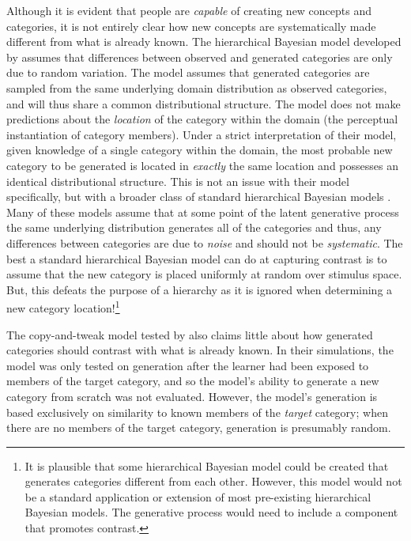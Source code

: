 \documentclass[12pt]{article}
\begin{document}
\begin{flushleft}
Although it is evident that people are {\em capable} of creating new concepts and categories, it is not entirely clear how new concepts are systematically made different from what is already known. The hierarchical Bayesian model developed by \cite{jern2013probabilistic} assumes that differences between observed and generated categories are only due to random variation. The model assumes that generated categories are sampled from the same underlying domain distribution as observed categories, and will thus share a common distributional structure. The model does not make predictions about the {\em location} of the category within the domain (the perceptual instantiation of category members). Under a strict interpretation of their model, given knowledge of a single category within the domain, the most probable new category to be generated is located in {\em exactly} the same location and possesses an identical distributional structure. This is not an issue with their model specifically, but with a broader class of standard hierarchical Bayesian models \citep[e.g., ][]{griffithsscn07,kemp07}. Many of these models assume that at some point of the latent generative process the same underlying distribution generates all of the categories and thus, any differences between categories are due to {\em noise} and should not be {\em systematic}. The best a standard hierarchical Bayesian model can do at capturing contrast is to assume that the new category is placed uniformly at random over stimulus space. But, this defeats the purpose of a hierarchy as it is ignored when determining a new category location!\footnote{It is plausible that some hierarchical Bayesian model could be created that generates categories different from each other. However, this model would not be a standard application or extension of most pre-existing hierarchical Bayesian models. The generative process would need to include a component that promotes contrast.}

The copy-and-tweak model tested by \cite{jern2013probabilistic} also claims little about how generated categories should contrast with what is already known. In their simulations, the model was only tested on generation after the learner had been exposed to members of the target category, and so the model's ability to generate a new category from scratch was not evaluated. However, the model's generation is based exclusively on similarity to known members of the {\em target} category; when there are no members of the target category, generation is presumably random.


\end{flushleft}
\end{document}
